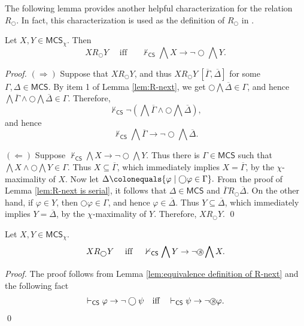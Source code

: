 \documentclass[envcountsect,envcountsame,oribibl,orivec]{llncs}
\newcommand*\circled[1]{\tikz[baseline=(char.base)]{
		\node[shape=circle,draw,inner sep=0.4pt] (char) {#1};}}
\newcommand{\lnext}{\bigcirc}
\newcommand{\sprevious}{\circled{\textit{s}}}
\newcommand{\CS}{\textsf{CS}}
\renewcommand{\phi}{\varphi}
\newcommand{\MCS}{\mathsf{MCS}}
\newcommand{\RO}[4]{#1 R_\lnext #2\ [#3, #4]}
\begin{document}
The following lemma provides another helpful characterization for the relation $R_\lnext$. In fact, this characterization is used as the definition  of $R_\lnext$ in \cite{HvdMV04}.

\begin{lemma}\label{lem:equivalence definition of R-next}
	Let $X,Y \in \MCS_\chi$. Then
	\[
	X R_\lnext Y
	\quad\text{ if{f} }\quad 
	\not\vdash_\CS \bigwedge X \to \lnot \lnext \bigwedge Y.
	\]
\end{lemma}
\begin{proof}
	$(\Rightarrow)$ Suppose that $X R_\lnext Y$, and thus $\RO{X}{Y}{\overline{\Gamma}}{\overline{\Delta}}$ for some $\Gamma, \Delta \in \MCS$. By item 1 of Lemma \ref{lem:R-next}, we get $\lnext \bigwedge \overline{\Delta} \in \Gamma$, and hence
	\( 
	\bigwedge \overline{\Gamma} \wedge \lnext \bigwedge \overline{\Delta} \in \Gamma.
	\)		
	Therefore, 
	\[
	\not \vdash_\CS \neg (\bigwedge \overline{\Gamma} \wedge \lnext \bigwedge \overline{\Delta}),
	\]
	and hence
	\[
	\nvdash_\CS \bigwedge \overline{\Gamma} \to \lnot \lnext \bigwedge \overline{\Delta}.
	\]
	
	$(\Leftarrow)$ Suppose $\nvdash_\CS \bigwedge X \to \lnot \lnext \bigwedge Y.$ Thus there is $\Gamma \in \MCS$ such that $\bigwedge X \wedge \lnext \bigwedge Y \in \Gamma$. Thus $X \subseteq \overline{\Gamma}$, which immediately implies $X = \overline{\Gamma}$, by the $\chi$-maximality of $X$. Now let
	\( 
	\Delta \colonequals \{ \phi \mid \lnext \phi \in \Gamma \}.
	\)
	From the proof of Lemma \ref{lem:R-next is serial}, it follows that $\Delta \in \MCS$ and $\overline{\Gamma} R_\lnext \overline{\Delta}$. On the other hand, if $\phi \in Y$, then $\lnext \phi \in \Gamma$, and hence $\phi \in \overline{\Delta}$. Thus $Y \subseteq \overline{\Delta}$, which immediately implies $Y = \overline{\Delta}$, by the $\chi$-maximality of $Y$. Therefore, $X R_\lnext Y$. 
	\qed
\end{proof}


\begin{lemma}\label{lem:equivalence definition of R-next by sprevious}
	Let $X, Y \in \MCS_\chi$.
	\[
	X R_\lnext Y 
	\quad\text{ if{f} }\quad 
	\nvdash_\CS \bigwedge Y \to \lnot \sprevious \bigwedge X.
	\]
\end{lemma}
\begin{proof}
	The proof follows from Lemma \ref{lem:equivalence definition of R-next} and the following fact
	\begin{align*}
		\vdash_\CS \phi \to \neg \lnext \psi \quad\mbox{iff}\quad \vdash_\CS \psi \to \neg \sprevious \phi. 
	\end{align*}
	\qed
\end{proof}
\end{document}
